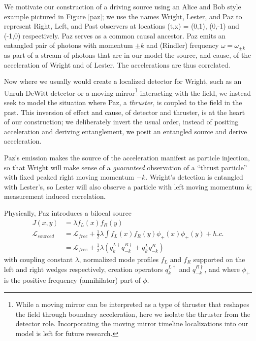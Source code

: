 \documentclass[12pt,a4paper]{article}
\begin{document}
We motivate our construction of a driving source using an Alice and Bob style example pictured in Figure \ref{paz}; we use the names Wright, Lester, and Paz to represent Right, Left, and Past observers at locations (t,x) = (0,1), (0,-1) and (-1,0) respectively. Paz serves as a common causal ancestor.  Paz emits an entangled pair of photons with momentum $\pm k$ and (Rindler) frequency $\omega = \omega_{\pm k}$ as part of a stream of photons that are in our model the source, and cause, of the acceleration of Wright and of Lester.  The accelerations are thus correlated.

Now where we usually would create a localized detector for Wright, such as an Unruh-DeWitt detector \cite{unruh1976notes} \cite{einstein1979general} or a moving mirror\footnote{While a moving mirror can be interpreted as a type of thruster that reshapes the field through boundary acceleration, here we isolate the thruster from the detector role. Incorporating the moving mirror timeline localizations into our model is left for future research.} \cite{fulling1976radiation} interacting with the field, we instead seek to model the situation where Paz, a {\it thruster}, is coupled to the field in the past. This inversion of effect and cause, of detector and thruster, is at the heart of our construction; we deliberately invert the usual order, instead of positing acceleration and deriving entanglement, we posit an entangled source and derive acceleration. 

Paz's emission makes the source of the acceleration manifest as particle injection, so that Wright will make sense of a {\it guaranteed} observation of a ``thrust particle'' with fixed peaked right moving momentum $-k$. Wright’s detection is entangled with Lester’s, so Lester will also observe a particle with left moving momentum $k$; measurement induced correlation.  

Physically, Paz introduces a bilocal source 
\begin{equation}
  \begin{aligned}
    J(x,y) &= \lambda f_L(x)f_R(y)\\
    \mathscr{L}_{sourced} & = \mathscr{L}_{free} + \frac{1}{2}\lambda \int f_L(x)f_R(y) \phi_+(x) \phi_+(y)  + h.c.\\
                        &= \mathscr{L}_{free} + \frac{1}{2}\lambda \left(q_{k}^{L\dagger} q_{-k}^{R\dagger} + q_{k}^{L} q_{-k}^{R} \right)
 \end{aligned}
 \label{bilocal}
\end{equation}
with coupling constant $\lambda$, normalized mode profiles $f_L$ and $f_R$ supported on the left and right wedges respectively, creation operators $q_{k}^{L\dagger}$ and $q_{-k}^{R\dagger}$, and where $\phi_+$ is the positive frequency (annihilator) part of $\phi$.
\end{document}
